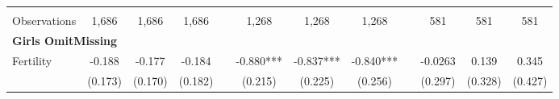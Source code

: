\begin{landscape}
\begin{table}[htpb!]
\begin{center}
\begin{tabular}{lcccp{2mm}cccp{2mm}ccc}
\begin{footnotesize}\end{footnotesize}&\begin{footnotesize}\end{footnotesize}&\begin{footnotesize}\end{footnotesize}&\begin{footnotesize}\end{footnotesize}&\begin{footnotesize}\end{footnotesize}&\begin{footnotesize}\end{footnotesize}&\begin{footnotesize}\end{footnotesize}&\begin{footnotesize}\end{footnotesize}&\begin{footnotesize}\end{footnotesize}&\begin{footnotesize}\end{footnotesize}&\begin{footnotesize}\end{footnotesize}&\begin{footnotesize}\end{footnotesize}\\Observations&1,686&1,686&1,686&&1,268&1,268&1,268&&581&581&581\\
\multicolumn{12}{l}{\textbf{Girls OmitMissing}}\\ 
Fertility&-0.188&-0.177&-0.184&&-0.880***&-0.837***&-0.840***&&-0.0263&0.139&0.345\\
&(0.173)&(0.170)&(0.182)&&(0.215)&(0.225)&(0.256)&&(0.297)&(0.328)&(0.427)\\

\end{tabular}
\end{center}
\end{table}
\end{landscape}
